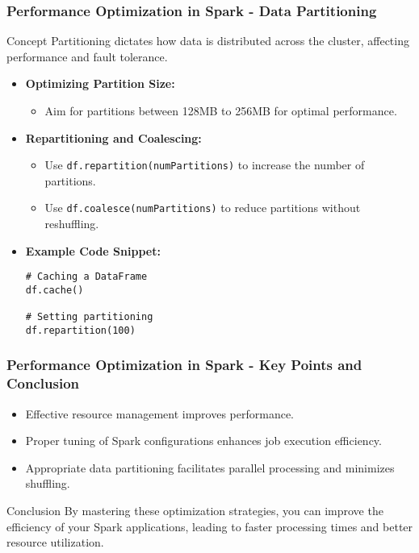 \documentclass[aspectratio=169]{beamer}
\begin{document}
\begin{frame}[fragile]
    \frametitle{Performance Optimization in Spark - Data Partitioning}
    \begin{block}{Concept}
        Partitioning dictates how data is distributed across the cluster, affecting performance and fault tolerance.
    \end{block}

    \begin{itemize}
        \item \textbf{Optimizing Partition Size:}
        \begin{itemize}
            \item Aim for partitions between 128MB to 256MB for optimal performance.
        \end{itemize}

        \item \textbf{Repartitioning and Coalescing:}
        \begin{itemize}
            \item Use \texttt{df.repartition(numPartitions)} to increase the number of partitions.
            \item Use \texttt{df.coalesce(numPartitions)} to reduce partitions without reshuffling.
        \end{itemize}

        \item \textbf{Example Code Snippet:}
        \begin{lstlisting}
# Caching a DataFrame
df.cache()

# Setting partitioning
df.repartition(100)
        \end{lstlisting}
    \end{itemize}
\end{frame}

\begin{frame}[fragile]
    \frametitle{Performance Optimization in Spark - Key Points and Conclusion}
    \begin{itemize}
        \item Effective resource management improves performance.
        \item Proper tuning of Spark configurations enhances job execution efficiency.
        \item Appropriate data partitioning facilitates parallel processing and minimizes shuffling.
    \end{itemize}

    \begin{block}{Conclusion}
        By mastering these optimization strategies, you can improve the efficiency of your Spark applications, leading to faster processing times and better resource utilization.
    \end{block}
\end{frame}
\end{document}
